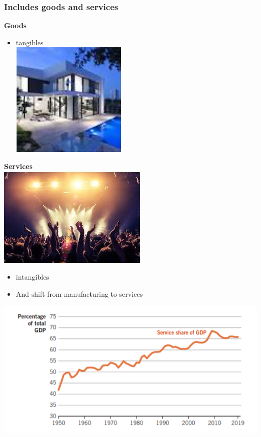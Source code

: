 \documentclass[12pt]{article} %
\begin{document}
\subsubsection*{Includes goods and services}
\textbf{Goods}
\begin{itemize}
	\item{tangibles} \\
	\includegraphics[scale=0.6]{../images/Picture5.jpg}
\end{itemize}
\textbf{Services} \\ \includegraphics[scale=0.6]{../images/Picture6.jpg} 

\begin{itemize}
	\item{intangibles}
\end{itemize}

\begin{itemize}
	\item{And shift from manufacturing to services}
\end{itemize}

\includegraphics[scale=0.5]{../images/Picture7.png} 
\end{document}
